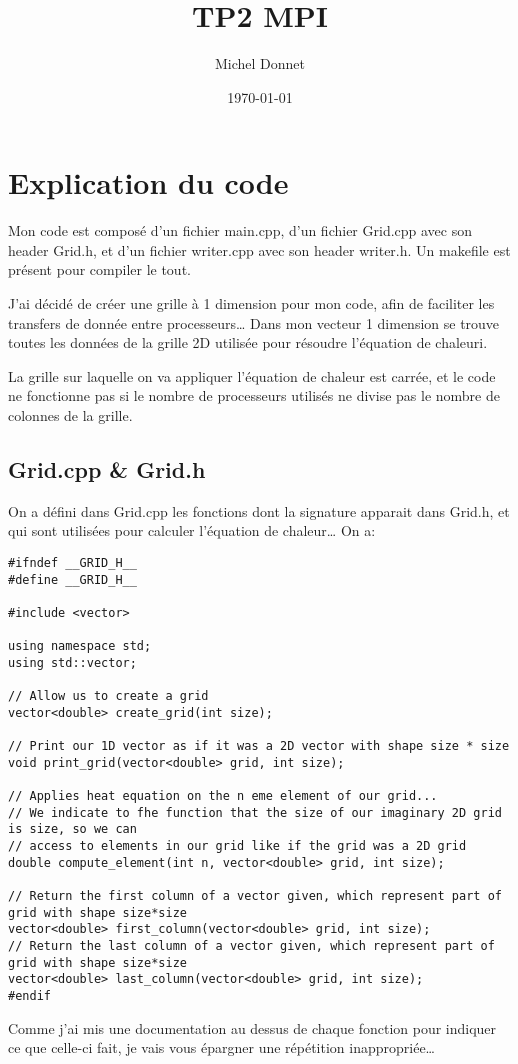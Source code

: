 \documentclass[11pt]{article}
\author{Michel Donnet}
\date{\today}
\title{TP2 MPI}
\begin{document}
\maketitle
\tableofcontents

\pagebreak

\section{Explication du code}
\label{sec:orgb593f03}

Mon code est composé d'un fichier main.cpp, d'un fichier Grid.cpp avec son header Grid.h,
et d'un fichier writer.cpp avec son header writer.h. Un makefile est présent pour compiler le tout.

J'ai décidé de créer une grille à 1 dimension pour mon code, afin de faciliter les transfers de donnée
entre processeurs\ldots{} Dans mon vecteur 1 dimension se trouve toutes les données de la grille 2D utilisée
pour résoudre l'équation de chaleuri.

La grille sur laquelle on va appliquer l'équation de chaleur est carrée, et le code ne fonctionne pas
si le nombre de processeurs utilisés ne divise pas le nombre de colonnes de la grille.

\subsection{Grid.cpp \& Grid.h}
\label{sec:org81717c6}
On a défini dans Grid.cpp les fonctions dont la signature apparait dans Grid.h, et qui sont utilisées
pour calculer l'équation de chaleur\ldots{} On a:
\begin{verbatim}
#ifndef __GRID_H__
#define __GRID_H__

#include <vector>

using namespace std;
using std::vector;

// Allow us to create a grid
vector<double> create_grid(int size);

// Print our 1D vector as if it was a 2D vector with shape size * size
void print_grid(vector<double> grid, int size);

// Applies heat equation on the n eme element of our grid...
// We indicate to fhe function that the size of our imaginary 2D grid is size, so we can
// access to elements in our grid like if the grid was a 2D grid
double compute_element(int n, vector<double> grid, int size);

// Return the first column of a vector given, which represent part of grid with shape size*size
vector<double> first_column(vector<double> grid, int size);
// Return the last column of a vector given, which represent part of grid with shape size*size
vector<double> last_column(vector<double> grid, int size);
#endif
\end{verbatim}
Comme j'ai mis une documentation au dessus de chaque fonction pour indiquer ce que celle-ci fait, je
vais vous épargner une répétition inappropriée\ldots{}
\end{document}
